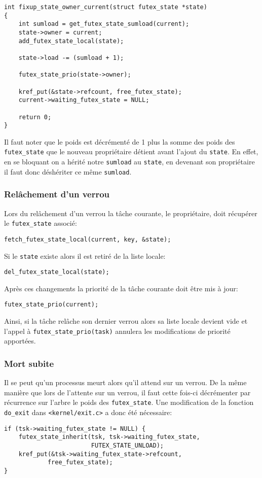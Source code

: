 \begin{lstlisting}[tabsize=4]
int fixup_state_owner_current(struct futex_state *state)
{
	int sumload = get_futex_state_sumload(current);
	state->owner = current;
	add_futex_state_local(state);

	state->load -= (sumload + 1);	

	futex_state_prio(state->owner);
	
	kref_put(&state->refcount, free_futex_state);
	current->waiting_futex_state = NULL;
	
	return 0;
}
\end{lstlisting}

Il faut noter que le poids est décrémenté de 1 plus la somme des poids des \verb|futex_state| 
que le nouveau propriétaire détient avant l'ajout du \verb|state|. En effet, en se bloquant on a hérité notre \verb|sumload| au \verb|state|, en devenant son propriétaire il faut donc déshériter ce même \verb|sumload|.

\subsubsection{Relâchement d'un verrou}

Lors du relâchement d'un verrou la tâche courante, le propriétaire, doit récupérer le \verb|futex_state| associé:
\begin{lstlisting}[tabsize=4]
	fetch_futex_state_local(current, key, &state);
\end{lstlisting}
Si le \verb|state| existe alors il est retiré de la liste locale:
\begin{lstlisting}[tabsize=4]
	del_futex_state_local(state);
\end{lstlisting}
Après ces changements la priorité de la tâche courante doit être mis à jour:
\begin{lstlisting}[tabsize=4]
	futex_state_prio(current);
\end{lstlisting}

Ainsi, si la tâche relâche son dernier verrou alors sa liste locale devient vide et l'appel
à \verb|futex_state_prio(task)| annulera les modifications de priorité apportées.

\subsubsection{Mort subite}

Il se peut qu'un processus meurt alors qu'il attend sur un verrou. De la même manière que lors de
l'attente sur un verrou, il faut cette fois-ci décrémenter par récurrence sur l'arbre 
le poids des \verb|futex_state|.
Une modification de la fonction \verb|do_exit| dans \verb|<kernel/exit.c>| a donc été nécessaire:
\begin{lstlisting}[tabsize=4]
if (tsk->waiting_futex_state != NULL) {
	futex_state_inherit(tsk, tsk->waiting_futex_state,
						FUTEX_STATE_UNLOAD);
	kref_put(&tsk->waiting_futex_state->refcount, 
			free_futex_state);
}
\end{lstlisting}

